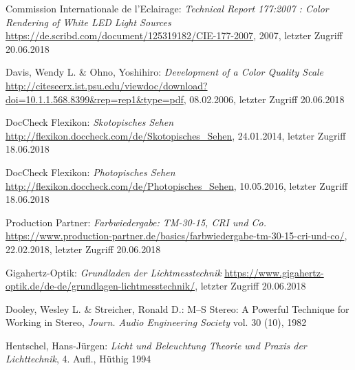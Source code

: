 \begin{thebibliography}{}



Commission Internationale de l'Eclairage:
\emph{\glqq Technical Report 177:2007 : Color Rendering of White LED Light Sources\grqq}
\url{https://de.scribd.com/document/125319182/CIE-177-2007}, 2007, letzter Zugriff 20.06.2018

Davis, Wendy L. \& Ohno, Yoshihiro:
\emph{\glqq Development of a Color Quality Scale\grqq}
\url{http://citeseerx.ist.psu.edu/viewdoc/download?doi=10.1.1.568.8399&rep=rep1&type=pdf}, 08.02.2006, letzter Zugriff 20.06.2018

DocCheck Flexikon:
\emph{\glqq Skotopisches Sehen\grqq}
\url{http://flexikon.doccheck.com/de/Skotopisches_Sehen}, 24.01.2014, letzter Zugriff 18.06.2018

DocCheck Flexikon:
\emph{\glqq Photopisches Sehen\grqq}
\url{http://flexikon.doccheck.com/de/Photopisches_Sehen}, 10.05.2016, letzter Zugriff 18.06.2018

Production Partner:
\emph{\glqq Farbwiedergabe: TM-30-15, CRI und Co.\grqq}
\url{https://www.production-partner.de/basics/farbwiedergabe-tm-30-15-cri-und-co/}, 22.02.2018, letzter Zugriff 20.06.2018


Gigahertz-Optik:
\emph{\glqq Grundladen der Lichtmesstechnik\grqq}
\url{https://www.gigahertz-optik.de/de-de/grundlagen-lichtmesstechnik/}, letzter Zugriff 20.06.2018


Dooley, Wesley L.  \& Streicher, Ronald D.:
\glqq M--S Stereo: A Powerful Technique for Working in Stereo\grqq, 
\emph{Journ. Audio Engineering Society} vol. 30 (10), 1982


Hentschel, Hans-Jürgen: 
\emph{Licht und Beleuchtung Theorie und Praxis der Lichttechnik}, 4. Aufl., Hüthig 1994


\end{thebibliography}
